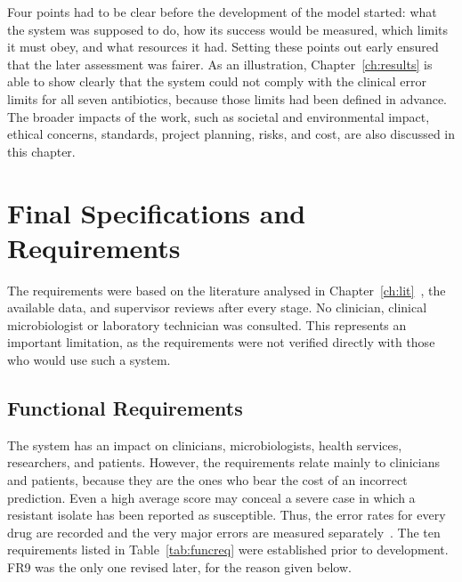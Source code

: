 
Four points had to be clear before the development of the model started: what the system was
supposed to do, how its success would be measured, which limits it must obey, and what
resources it had. Setting these points out early ensured that the later assessment was fairer.
As an illustration, Chapter~\ref{ch:results} is able to show clearly that the system could not
comply with the clinical error limits for all seven antibiotics, because those limits had been
defined in advance. The broader impacts of the work, such as societal and environmental impact,
ethical concerns, standards, project planning, risks, and cost, are also discussed in this
chapter.

\section{Final Specifications and Requirements}
\label{sec:specs}

The requirements were based on the literature analysed in Chapter~\ref{ch:lit}~\cite{Kim2022,
Sakagianni2023}, the available data, and supervisor reviews after every stage. No clinician,
clinical microbiologist or laboratory technician was consulted. This represents an important
limitation, as the requirements were not verified directly with those who would use such a
system.

\subsection{Functional Requirements}

The system has an impact on clinicians, microbiologists, health services, researchers, and
patients. However, the requirements relate mainly to clinicians and patients, because they are
the ones who bear the cost of an incorrect prediction. Even a high average score may conceal a
severe case in which a resistant isolate has been reported as susceptible. Thus, the error
rates for every drug are recorded and the very major errors are measured
separately~\cite{Kim2022, Hu2024, who_amr_2019, Yu2025}. The ten requirements listed in
Table~\ref{tab:funcreq} were established prior to development. FR9 was the only one revised
later, for the reason given below.

